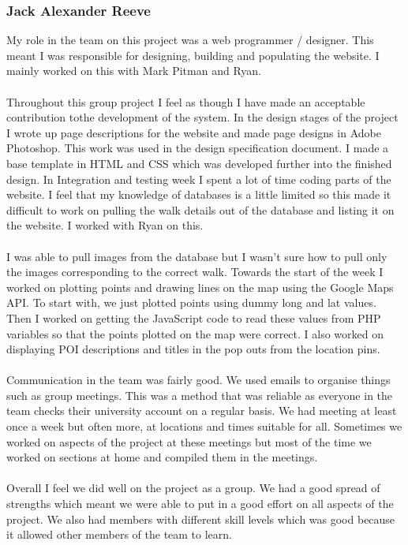 \documentclass[12pt, portrait]{article}
\begin{document}
\subsubsection{Jack Alexander Reeve}
My role in the team on this project was a web programmer / designer. This meant I was responsible for designing, building and populating the website. I mainly worked on this with Mark Pitman and Ryan.
~\\\\
Throughout this group project I feel as though I have made an acceptable contribution tothe development of the system. In the design stages of the project I wrote up page descriptions for the website and made page designs in Adobe Photoshop. This work was used in the design specification document. I made a base template in HTML and CSS which was developed further into the finished design. In Integration and testing week I
spent a lot of time coding parts of the website. I feel that my knowledge of databases is a little limited so this made it difficult to work on pulling the walk details out of the database and listing it on the website. I worked with Ryan on this.
~\\\\
I was able to pull images from the database but I wasn't sure how to pull only the images corresponding to the correct walk. Towards the start of the week I worked on plotting points and drawing lines on the map using the Google Maps API. To start with, we just plotted points using dummy long and lat values. Then I worked on getting the JavaScript code to read these values from PHP variables so that the points plotted on the map were correct. I also worked on displaying POI descriptions and titles in the pop outs from the location pins.
~\\\\
Communication in the team was fairly good. We used emails to organise things such as group meetings. This was a method that was reliable as everyone in the team checks their university account on a regular basis. We had meeting at least once a week but often more, at locations and times suitable for all. Sometimes we worked on aspects of the project at these meetings but most of the time we worked on sections at home and
compiled them in the meetings.
~\\\\
Overall I feel we did well on the project as a group. We had a good spread of strengths which meant we were able to put in a good effort on all aspects of the project. We also had members with different skill levels which was good because it allowed other members of the team to learn.
\end{document}
